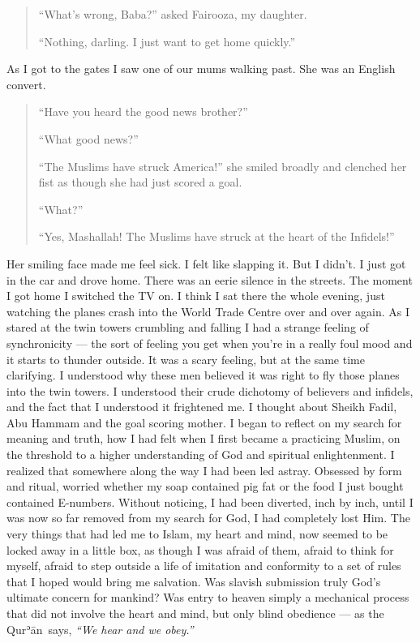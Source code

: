 \documentclass[12pt]{memoir}
\def\´{ʾ} %
\def \Quran{Qur\-\´ān} %
\def\–{-\hskip0pt}
\begin{document}
\begin{quote}
“What’s wrong, Baba?” asked Fairooza, my daughter.

“Nothing, darling.
I just want to get home quickly.”
\end{quote}

As I got to the gates I saw one of our mums walking past.
She was an English convert.

\begin{quote}
“Have you heard the good news brother?”

“What good news?”

“The Muslims have struck America!” she smiled broadly
and clenched her fist as though she had just scored a goal.

“What?”

“Yes, Mashallah! The Muslims have struck at the heart of the Infidels!”
\end{quote}

Her smiling face made me feel sick.
I felt like slapping it.
But I didn’t.
I just got in the car and drove home.
There was an eerie silence in the streets.
The moment I got home I switched the TV on.
I think I sat there the whole evening, just watching the planes
crash into the World Trade Centre over and over again.
As I stared at the twin towers crumbling and falling
I had a strange feeling of synchronicity —
the sort of feeling you get when you’re in a really foul mood
and it starts to thunder outside.
It was a scary feeling, but at the same time clarifying.
I understood why these men believed it was right
to fly those planes into the twin towers.
I understood their crude dichotomy of believers and infidels,
and the fact that I understood it frightened me.
I thought about Sheikh Fadil, Abu Hammam and the goal scoring mother.
I began to reflect on my search for meaning and truth,
how I had felt when I first became a practicing Muslim,
on the threshold to a higher understanding of God and spiritual enlightenment.
I realized that somewhere along the way I had been led astray.
Obsessed by form and ritual, worried whether my soap contained pig fat
or the food I just bought contained E\–numbers.
Without noticing, I had been diverted, inch by inch,
until I was now so far removed from my search for God,
I had completely lost Him.
The very things that had led me to Islam, my heart and mind,
now seemed to be locked away in a little box, as though I was afraid of them,
afraid to think for myself, afraid to step outside a life of imitation
and conformity to a set of rules that I hoped would bring me salvation.
Was slavish submission truly God’s ultimate concern for mankind?
Was entry to heaven simply a mechanical process
that did not involve the heart and mind,
but only blind obedience — as the \Quran\ says,
\emph{“We hear and we obey.”}
\end{document}
